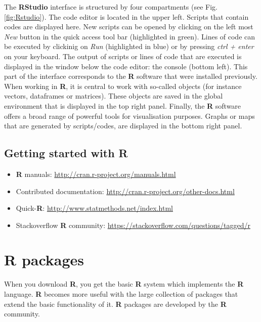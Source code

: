\documentclass[
  10pt,
  b5paper,
  oneside]{book}
\providecommand{\tightlist}{%
  \setlength{\itemsep}{0pt}\setlength{\parskip}{0pt}}
\begin{document}
The \textbf{RStudio} interface is structured by four compartments (see Fig. \ref{fig:Rstudio}). The code editor is located in the upper left. Scripts that contain codes are displayed here. New scripts can be opened by clicking on the left most \emph{New} button in the quick access tool bar (highlighted in green). Lines of code can be executed by clickinig on \emph{Run} (highlighted in blue) or by pressing \emph{ctrl + enter} on your keyboard.
The output of scripts or lines of code that are executed is displayed in the window below the code editor: the console (bottom left). This part of the interface corresponds to the \textbf{R} software that were installed previously.
When working in \textbf{R}, it is central to work with so-called objects (for instance vectors, dataframes or matrices). These objects are saved in the global environment that is displayed in the top right panel.
Finally, the \textbf{R} software offers a broad range of powerful tools for visualisation purposes. Graphs or maps that are generated by scripts/codes, are displayed in the bottom right panel.

\hypertarget{getting-started-with-r}{%
\subsection{Getting started with R}\label{getting-started-with-r}}

\begin{itemize}
\tightlist
\item
  \textbf{R} manuals: \url{http://cran.r-project.org/manuals.html}
\item
  Contributed documentation: \url{http://cran.r-project.org/other-docs.html}
\item
  Quick-\textbf{R}: \url{http://www.statmethods.net/index.html}
\item
  Stackoverflow \textbf{R} community: \url{https://stackoverflow.com/questions/tagged/r}
\end{itemize}

\hypertarget{r-packages}{%
\section{R packages}\label{r-packages}}

When you download \textbf{R}, you get the basic \textbf{R} system which implements the \textbf{R} language. \textbf{R} becomes more useful with the large collection of packages that extend the basic functionality of it. \textbf{R} packages are developed by the \textbf{R} community.
\end{document}
